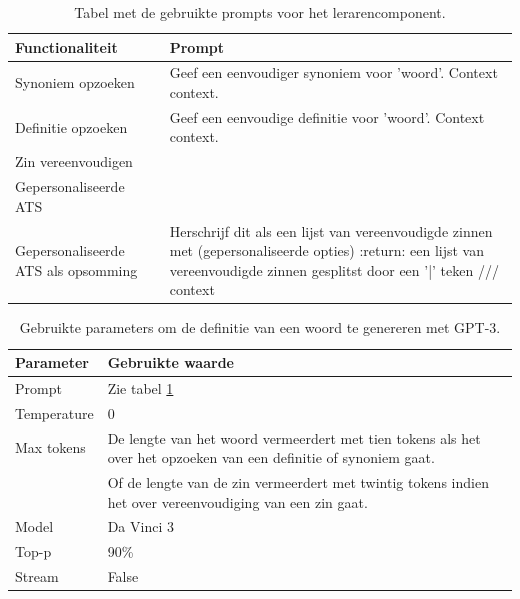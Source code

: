 \begin{center}
	
\end{center}
\begin{table}[H]
	\begin{tabular}{ | m{5cm} | m{10cm} |}
		\hline
		\textbf{Functionaliteit} & \textbf{Prompt} \\ \hline
		Synoniem opzoeken & Geef een eenvoudiger synoniem voor '{woord}'. Context {context}. \\ \hline
		Definitie opzoeken & Geef een eenvoudige definitie voor '{woord}'. Context {context}.\\ \hline
		Zin vereenvoudigen & \\ \hline
		Gepersonaliseerde ATS & \\ \hline
		Gepersonaliseerde ATS als opsomming & Herschrijf dit als een lijst van vereenvoudigde zinnen met (gepersonaliseerde opties) :return: een lijst van vereenvoudigde zinnen gesplitst door een '|' teken /// {context}\\ \hline
	\end{tabular}
	\caption{Tabel met de gebruikte prompts voor het lerarencomponent.}
	\label{table:prompts-lerarencomponent}
\end{table}

\begin{center}
	\begin{table}[H]
		\begin{tabular}{| m{5cm}| m{10cm} |}
			\hline
			Parameter & Gebruikte waarde \\ \hline
			Prompt & Zie tabel \ref{table:prompts-lerarencomponent} \\ \hline
			Temperature & 0 \\ \hline
			Max tokens & De lengte van het woord vermeerdert met tien tokens als het over het opzoeken van een definitie of synoniem gaat. \\ 
			& Of de lengte van de zin vermeerdert met twintig tokens indien het over vereenvoudiging van een zin gaat. \\
			\hline
			Model & Da Vinci 3 \\ \hline
			Top-p & 90\% \\ \hline
			Stream & False \\ \hline
		\end{tabular}
		\caption{Gebruikte parameters om de definitie van een woord te genereren met GPT-3.}
		\label{table:gpt-3-parameters-lerarencomponent}
	\end{table}
\end{center}


